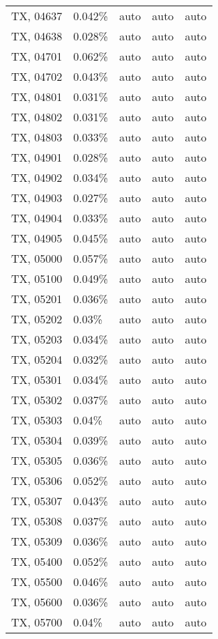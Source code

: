 \begin{longtable}[]{@{}lllll@{}}
TX, 04637 & 0.042\% & auto & auto & auto \\
TX, 04638 & 0.028\% & auto & auto & auto \\
TX, 04701 & 0.062\% & auto & auto & auto \\
TX, 04702 & 0.043\% & auto & auto & auto \\
TX, 04801 & 0.031\% & auto & auto & auto \\
TX, 04802 & 0.031\% & auto & auto & auto \\
TX, 04803 & 0.033\% & auto & auto & auto \\
TX, 04901 & 0.028\% & auto & auto & auto \\
TX, 04902 & 0.034\% & auto & auto & auto \\
TX, 04903 & 0.027\% & auto & auto & auto \\
TX, 04904 & 0.033\% & auto & auto & auto \\
TX, 04905 & 0.045\% & auto & auto & auto \\
TX, 05000 & 0.057\% & auto & auto & auto \\
TX, 05100 & 0.049\% & auto & auto & auto \\
TX, 05201 & 0.036\% & auto & auto & auto \\
TX, 05202 & 0.03\% & auto & auto & auto \\
TX, 05203 & 0.034\% & auto & auto & auto \\
TX, 05204 & 0.032\% & auto & auto & auto \\
TX, 05301 & 0.034\% & auto & auto & auto \\
TX, 05302 & 0.037\% & auto & auto & auto \\
TX, 05303 & 0.04\% & auto & auto & auto \\
TX, 05304 & 0.039\% & auto & auto & auto \\
TX, 05305 & 0.036\% & auto & auto & auto \\
TX, 05306 & 0.052\% & auto & auto & auto \\
TX, 05307 & 0.043\% & auto & auto & auto \\
TX, 05308 & 0.037\% & auto & auto & auto \\
TX, 05309 & 0.036\% & auto & auto & auto \\
TX, 05400 & 0.052\% & auto & auto & auto \\
TX, 05500 & 0.046\% & auto & auto & auto \\
TX, 05600 & 0.036\% & auto & auto & auto \\
TX, 05700 & 0.04\% & auto & auto & auto \\

\end{longtable}
